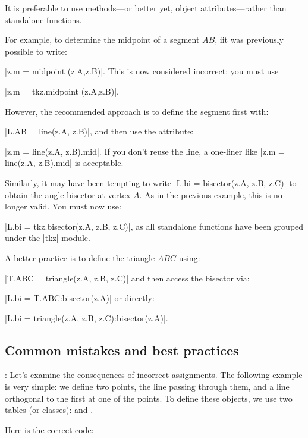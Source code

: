 It is preferable to use methods—or better yet, object attributes—rather than standalone functions.

For example, to determine the midpoint of a segment $AB$, iit was previously possible to write:

|z.m = midpoint (z.A,z.B)|.  This is now considered incorrect: you must use

|z.m = tkz.midpoint (z.A,z.B)|.

However, the recommended approach is to define the segment first with:

|L.AB = line(z.A, z.B)|, and then use the attribute:

|z.m = line(z.A, z.B).mid|. If you don't reuse the line, a one-liner like |z.m = line(z.A, z.B).mid| is acceptable.

\vspace{12pt}
Similarly, it may have been tempting to write |L.bi = bisector(z.A, z.B, z.C)| to obtain the angle bisector at vertex $A$. As in the previous example, this is no longer valid. You must now use:

|L.bi = tkz.bisector(z.A, z.B, z.C)|, as all standalone functions have been grouped under the |tkz| module.

A better practice is to define the triangle $ABC$ using:

|T.ABC = triangle(z.A, z.B, z.C)| and then access the bisector via:

|L.bi = T.ABC:bisector(z.A)| or directly:

|L.bi = triangle(z.A, z.B, z.C):bisector(z.A)|.

\subsection{Common mistakes and best practices}

\vspace{1em}
\tkzRHand{\textcolor{red}{Second Warning}}: Let's examine the consequences of incorrect assignments. The following example is very simple: we define two points, the line passing through them, and a line orthogonal to the first at one of the points. To define these objects, we use two tables (or classes):  and .

Here is the correct code:
\begin{tkzexample}[latex=.5\textwidth]
\end{tkzexample}

